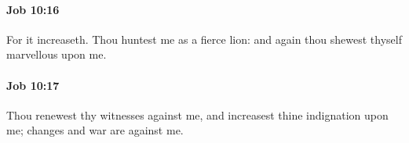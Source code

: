 		\paragraph{Job 10:16} %
			\label{JOB-10-16}

			For it increaseth. Thou huntest me as a fierce lion: and again thou shewest thyself marvellous upon me.


		\paragraph{Job 10:17} %
			\label{JOB-10-17}

			Thou renewest thy witnesses against me, and increasest thine indignation upon me; changes and war are against me.


